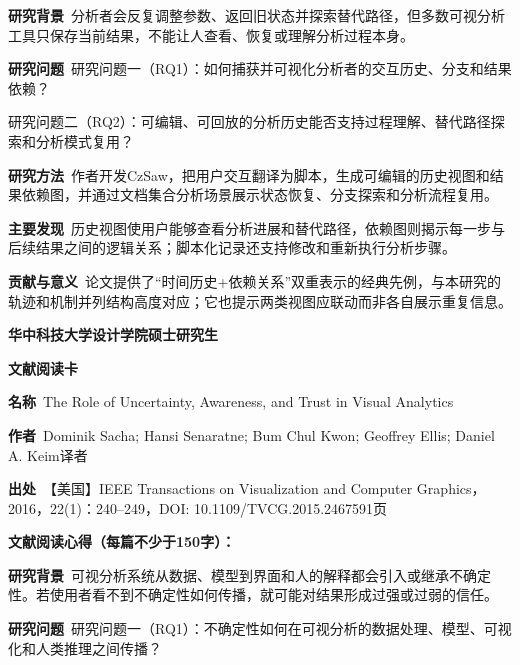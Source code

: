 \noindent\textbf{研究背景}\ 分析者会反复调整参数、返回旧状态并探索替代路径，但多数可视分析工具只保存当前结果，不能让人查看、恢复或理解分析过程本身。\par
\noindent\textbf{研究问题}\ 研究问题一（RQ1）：如何捕获并可视化分析者的交互历史、分支和结果依赖？\par
研究问题二（RQ2）：可编辑、可回放的分析历史能否支持过程理解、替代路径探索和分析模式复用？\par
\noindent\textbf{研究方法}\ 作者开发CzSaw，把用户交互翻译为脚本，生成可编辑的历史视图和结果依赖图，并通过文档集合分析场景展示状态恢复、分支探索和分析流程复用。\par
\noindent\textbf{主要发现}\ 历史视图使用户能够查看分析进展和替代路径，依赖图则揭示每一步与后续结果之间的逻辑关系；脚本化记录还支持修改和重新执行分析步骤。\par
\noindent\textbf{贡献与意义}\ 论文提供了“时间历史+依赖关系”双重表示的经典先例，与本研究的轨迹和机制并列结构高度对应；它也提示两类视图应联动而非各自展示重复信息。\par
\clearpage
\begin{center}
{\songti\bfseries\fontsize{18.5pt}{27.75pt}\selectfont 华中科技大学设计学院硕士研究生\par}
{\songti\bfseries\fontsize{18.5pt}{27.75pt}\selectfont 文献阅读卡\par}
\end{center}
\vspace{0.25em}
\noindent\underline{}\par
\vspace{0.35em}
\noindent\textbf{名称}\ The Role of Uncertainty, Awareness, and Trust in Visual Analytics\par
\noindent\textbf{作者}\ Dominik Sacha; Hansi Senaratne; Bum Chul Kwon; Geoffrey Ellis; Daniel A. Keim\quad 译者\par
\noindent\textbf{出处}\ 【美国】IEEE Transactions on Visualization and Computer Graphics，2016，22(1)：240–249，DOI: 10.1109/TVCG.2015.2467591\quad 页\par
\vspace{0.35em}
\noindent\textbf{文献阅读心得（每篇不少于150字）：}\par
\noindent\textbf{研究背景}\ 可视分析系统从数据、模型到界面和人的解释都会引入或继承不确定性。若使用者看不到不确定性如何传播，就可能对结果形成过强或过弱的信任。\par
\noindent\textbf{研究问题}\ 研究问题一（RQ1）：不确定性如何在可视分析的数据处理、模型、可视化和人类推理之间传播？\par
